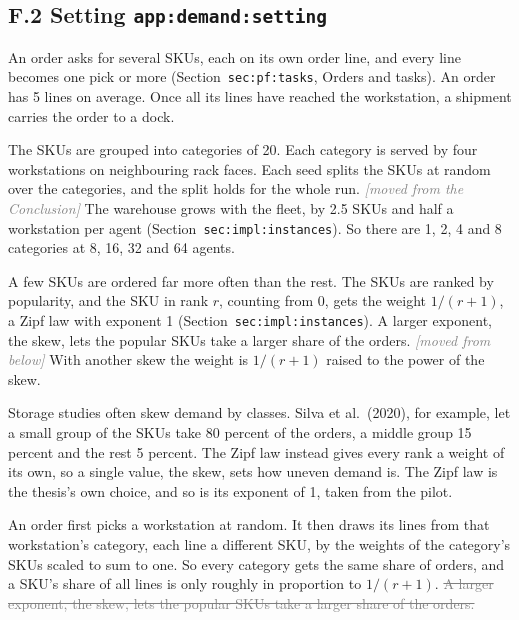 \documentclass[11pt,a4paper]{article}
\newcommand{\new}[1]{\textcolor{newc}{#1}}
\newcommand{\old}[1]{\textcolor{gray}{\sout{#1}}}
\newenvironment{greenblock}{\color{newc}}{}
\newcommand{\lref}[1]{{\small\texttt{#1}}}
\newcommand{\moved}[1]{{\small\textcolor{gray}{\emph{[moved from #1]}}}}
\begin{document}
\subsection*{F.2 Setting \hfill\lref{app:demand:setting}}

An order asks for several SKUs, each on its own order line, and every line
becomes one pick or more (Section~\lref{sec:pf:tasks}, Orders and tasks).
\new{An order has 5 lines on average. Once all its lines have reached the
workstation, a shipment carries the order to a dock.}

\begin{greenblock}
The SKUs are grouped into categories of 20. Each category is served by four
workstations on neighbouring rack faces.
\end{greenblock}
Each seed splits the SKUs at random over the categories, and the split holds
for the whole run. \moved{the Conclusion}
\new{The warehouse grows with the fleet, by 2.5 SKUs and half a workstation
per agent (Section~\lref{sec:impl:instances}). So there are 1, 2, 4 and 8
categories at 8, 16, 32 and 64 agents.}

\new{A few SKUs are ordered far more often than the rest.} The SKUs are
ranked by popularity, and the SKU in rank $r$, counting from $0$, gets the
weight $1/(r+1)$, a Zipf law with exponent 1
(Section~\lref{sec:impl:instances}). A larger exponent, the skew, lets the
popular SKUs take a larger share of the orders. \moved{below}
\new{With another skew the weight is $1/(r+1)$ raised to the power of the
skew.}

\begin{greenblock}
Storage studies often skew demand by classes. Silva et al.\ (2020), for
example, let a small group of the SKUs take 80 percent of the orders, a middle
group 15 percent and the rest 5 percent. The Zipf law instead gives every rank
a weight of its own, so a single value, the skew, sets how uneven demand is.
The Zipf law is the thesis's own choice, and so is its exponent of 1, taken
from the pilot.
\end{greenblock}

An order first picks a workstation at random. It then draws its lines from
that workstation's category, each line a different SKU, by the weights of the
category's SKUs scaled to sum to one. So every category gets the same share
of orders, and a SKU's share of all lines is only roughly in proportion to
$1/(r+1)$. \old{A larger exponent, the skew, lets the popular SKUs take a
larger share of the orders.}
\end{document}
